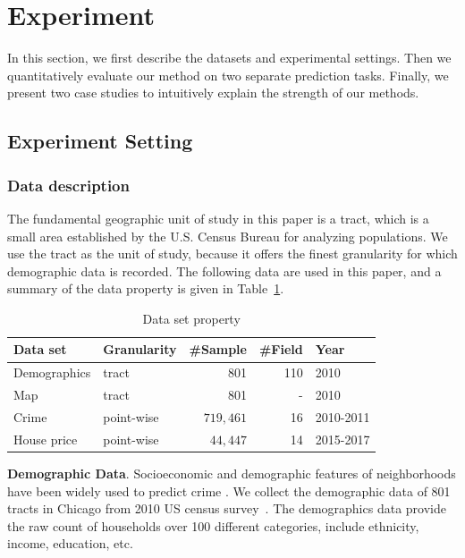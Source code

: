 \section{Experiment}
\label{ch4-sec:experiment}

In this section, we first describe the datasets and experimental settings. Then we quantitatively evaluate our method on two separate prediction tasks. Finally, we present two case studies to intuitively explain the strength of our methods. 


\subsection{Experiment Setting}  \label{data:sets}

\subsubsection{Data description}
The fundamental geographic unit of study in this paper is a tract, which is a small area established by the U.S. Census Bureau for analyzing populations. We use the tract as the unit of study, because it offers the finest granularity for which demographic data is recorded. The following data are used in this paper, and a summary of the data property is given in Table~\ref{tab:data-summary}.

\begin{table}
\centering
\caption{Data set property}
\label{tab:data-summary}
\begin{tabular}{|l|l|r|r|l|}
\hline
Data set & Granularity & \#Sample & \#Field & Year \\ \hline
Demographics & tract & 801 & 110 & 2010 \\ \hline
Map & tract & 801 & - & 2010 \\ \hline
Crime & point-wise & $719,461$ & 16 & 2010-2011 \\ \hline
House price & point-wise & $44,447$ & 14 & 2015-2017 \\ \hline
\end{tabular}
\end{table}

\textbf{Demographic Data}. Socioeconomic and demographic features of neighborhoods have been widely used to predict crime \cite{wang2016simple}. We collect the demographic data of 801 tracts in Chicago from 2010 US census survey~\cite{census:2010}. The demographics data provide the raw count of households over 100 different categories, include ethnicity, income, education, etc.


